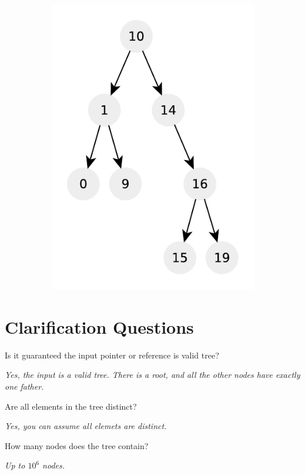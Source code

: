 \begin{figure}
\begin{subfigure}[t]{0.30\textwidth}
		 \includegraphics[width=1\linewidth]{sources/verify_BST/images/example4}
		 \label{fig:verify:example4}
	  \end{subfigure}
	 \caption[]{}
	  \label{fig:verify:trees}
\end{figure}



\section{Clarification Questions}

\begin{QandA}
	\item Is it guaranteed the input pointer or reference is valid tree?
	\begin{answered}
		\textit{Yes, the input is a valid tree. There is a root, and all the other nodes have exactly one father.}
	\end{answered}
	\item Are all elements in the tree distinct?
	\begin{answered}
		\textit{Yes, you can assume all elemets are distinct.}
	\end{answered}
	\item How many nodes does the tree contain?
	\begin{answered}
		\textit{Up to $10^6$ nodes.}
	\end{answered}
\end{QandA}

